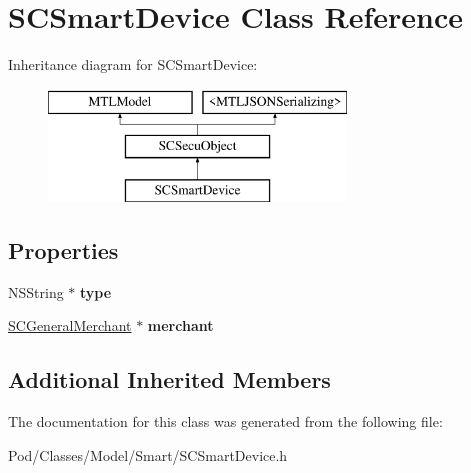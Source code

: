 \hypertarget{interface_s_c_smart_device}{}\section{S\+C\+Smart\+Device Class Reference}
\label{interface_s_c_smart_device}
Inheritance diagram for S\+C\+Smart\+Device\+:\begin{figure}[H]
\begin{center}
\leavevmode
\includegraphics[height=3.000000cm]{interface_s_c_smart_device}
\end{center}
\end{figure}
\subsection*{Properties}
\begin{DoxyCompactItemize}
\item 
N\+S\+String $\ast$ {\bfseries type}\hypertarget{interface_s_c_smart_device_aa03390de114c12fe52e17d3e0a740e9a}{}\label{interface_s_c_smart_device_aa03390de114c12fe52e17d3e0a740e9a}

\item 
\hyperlink{interface_s_c_general_merchant}{S\+C\+General\+Merchant} $\ast$ {\bfseries merchant}\hypertarget{interface_s_c_smart_device_a34a9da0e1259096d45c06f18ba02b2a7}{}\label{interface_s_c_smart_device_a34a9da0e1259096d45c06f18ba02b2a7}

\end{DoxyCompactItemize}
\subsection*{Additional Inherited Members}


The documentation for this class was generated from the following file\+:\begin{DoxyCompactItemize}
\item 
Pod/\+Classes/\+Model/\+Smart/S\+C\+Smart\+Device.\+h\end{DoxyCompactItemize}
